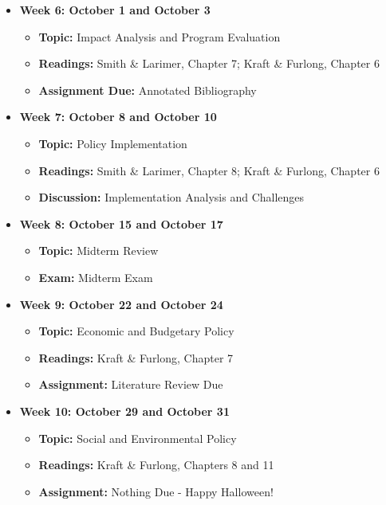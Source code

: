 \documentclass[12pt, letterpaper]{article}
\begin{document}
\begin{itemize}
    \item \textbf{Week 6: October 1 and October 3}
    \begin{itemize}
        \item \textbf{Topic:} Impact Analysis and Program Evaluation
        \item \textbf{Readings:} Smith \& Larimer, Chapter 7; Kraft \& Furlong, Chapter 6
        \item \textbf{Assignment Due:} Annotated Bibliography 
    \end{itemize}

    \item \textbf{Week 7: October 8 and October 10}
    \begin{itemize}
        \item \textbf{Topic:} Policy Implementation
        \item \textbf{Readings:} Smith \& Larimer, Chapter 8; Kraft \& Furlong, Chapter 6
        \item \textbf{Discussion:} Implementation Analysis and Challenges
    \end{itemize}

    \item \textbf{Week 8: October 15 and October 17}
    \begin{itemize}
        \item \textbf{Topic:} Midterm Review
        \item \textbf{Exam:} Midterm Exam
    \end{itemize}

    \item \textbf{Week 9: October 22 and October 24}
    \begin{itemize}
        \item \textbf{Topic:} Economic and Budgetary Policy
        \item \textbf{Readings:} Kraft \& Furlong, Chapter 7
        \item \textbf{Assignment:} Literature Review Due
    \end{itemize}

    \item \textbf{Week 10: October 29 and October 31}
    \begin{itemize}
        \item \textbf{Topic:} Social and Environmental Policy
        \item \textbf{Readings:} Kraft \& Furlong, Chapters 8 and 11
        \item \textbf{Assignment:} Nothing Due - Happy Halloween!
    \end{itemize}


\end{itemize}
\end{document}
